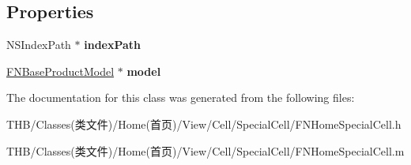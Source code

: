 \subsection*{Properties}
\begin{DoxyCompactItemize}
\item 
\mbox{\label{interface_f_n_home_special_cell_afb318d6c8d7bc3d7fa79c83e0c3123ca}} 
N\+S\+Index\+Path $\ast$ {\bfseries index\+Path}
\item 
\mbox{\label{interface_f_n_home_special_cell_a03c36226428279cfbcb5aef279247868}} 
\mbox{\hyperlink{interface_f_n_base_product_model}{F\+N\+Base\+Product\+Model}} $\ast$ {\bfseries model}
\end{DoxyCompactItemize}


The documentation for this class was generated from the following files\+:\begin{DoxyCompactItemize}
\item 
T\+H\+B/\+Classes(类文件)/\+Home(首页)/\+View/\+Cell/\+Special\+Cell/F\+N\+Home\+Special\+Cell.\+h\item 
T\+H\+B/\+Classes(类文件)/\+Home(首页)/\+View/\+Cell/\+Special\+Cell/F\+N\+Home\+Special\+Cell.\+m\end{DoxyCompactItemize}
